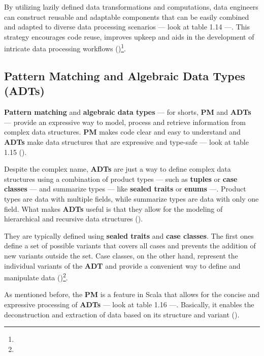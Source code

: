 

By utilizing lazily defined data transformations and computations, data engineers can construct reusable and adaptable components that can be easily combined and adapted to diverse data processing scenarios — look at table 1.14 —. This strategy encourages code reuse, improves upkeep and aids in the development of intricate data processing workflows (\cite{michael.etal_2023})\footnote[14]{}.



\subsection{Pattern Matching and Algebraic Data Types (ADTs)}

\textbf{Pattern matching} and \textbf{algebraic data types} — for shorts,  \textbf{PM} and \textbf{ADTs} — provide an expressive way to model, process and retrieve information from complex data structures. \textbf{PM} makes code clear and easy to understand and \textbf{ADTs} make data structures that are expressive and type-safe — look at table 1.15 (\cite{michael.etal_2023})\footnotemark[11].

Despite the complex name, \textbf{ADTs} are just a way to define complex data structures using a combination of product types — such as \textbf{tuples} or \textbf{case classes} — and summarize types — like \textbf{sealed traits} or \textbf{enums} —. Product types are data with multiple fields, while summarize types are data with only one field. What makes \textbf{ADTs} useful is that they allow for the modeling of hierarchical and recursive data structures (\cite{michael.etal_2023})\footnotemark[11].

They are typically defined using \textbf{sealed traits} and \textbf{case classes}. The first ones define a set of possible variants that covers all cases and prevents the addition of new variants outside the set. Case classes, on the other hand, represent the individual variants of the \textbf{ADT} and provide a convenient way to define and manipulate data (\cite{michael.etal_2023})\footnote[11]{}.



As mentioned before, the \textbf{PM} is a feature in Scala that allows for the concise and expressive processing of \textbf{ADTs} — look at table 1.16 —. Basically, it enables the deconstruction and extraction of data based on its structure and variant (\cite{michael.etal_2023})\footnotemark[11].

